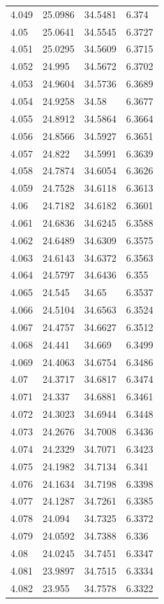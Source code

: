 \begin{tabular}{llll}
4.049 & 25.0986 & 34.5481 & 6.374 \\
4.05 & 25.0641 & 34.5545 & 6.3727 \\
4.051 & 25.0295 & 34.5609 & 6.3715 \\
4.052 & 24.995 & 34.5672 & 6.3702 \\
4.053 & 24.9604 & 34.5736 & 6.3689 \\
4.054 & 24.9258 & 34.58 & 6.3677 \\
4.055 & 24.8912 & 34.5864 & 6.3664 \\
4.056 & 24.8566 & 34.5927 & 6.3651 \\
4.057 & 24.822 & 34.5991 & 6.3639 \\
4.058 & 24.7874 & 34.6054 & 6.3626 \\
4.059 & 24.7528 & 34.6118 & 6.3613 \\
4.06 & 24.7182 & 34.6182 & 6.3601 \\
4.061 & 24.6836 & 34.6245 & 6.3588 \\
4.062 & 24.6489 & 34.6309 & 6.3575 \\
4.063 & 24.6143 & 34.6372 & 6.3563 \\
4.064 & 24.5797 & 34.6436 & 6.355 \\
4.065 & 24.545 & 34.65 & 6.3537 \\
4.066 & 24.5104 & 34.6563 & 6.3524 \\
4.067 & 24.4757 & 34.6627 & 6.3512 \\
4.068 & 24.441 & 34.669 & 6.3499 \\
4.069 & 24.4063 & 34.6754 & 6.3486 \\
4.07 & 24.3717 & 34.6817 & 6.3474 \\
4.071 & 24.337 & 34.6881 & 6.3461 \\
4.072 & 24.3023 & 34.6944 & 6.3448 \\
4.073 & 24.2676 & 34.7008 & 6.3436 \\
4.074 & 24.2329 & 34.7071 & 6.3423 \\
4.075 & 24.1982 & 34.7134 & 6.341 \\
4.076 & 24.1634 & 34.7198 & 6.3398 \\
4.077 & 24.1287 & 34.7261 & 6.3385 \\
4.078 & 24.094 & 34.7325 & 6.3372 \\
4.079 & 24.0592 & 34.7388 & 6.336 \\
4.08 & 24.0245 & 34.7451 & 6.3347 \\
4.081 & 23.9897 & 34.7515 & 6.3334 \\
4.082 & 23.955 & 34.7578 & 6.3322 \\

\end{tabular}
